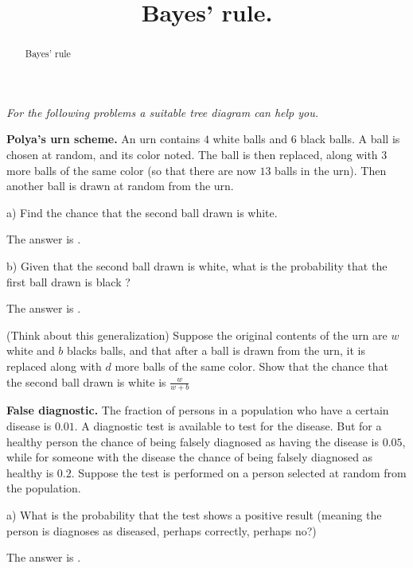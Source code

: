 \documentclass{ximera}
\title{Bayes' rule.}
\begin{document}
\begin{abstract}
Bayes' rule
\end{abstract}
\maketitle

{\it For the following problems a suitable tree diagram can help you.}\vspace{.25cm}

{\bf Polya's urn scheme.} An urn contains $4$ white balls and $6$ black balls. A ball is chosen at random, and its color noted. The ball is then replaced, along with $3$ more balls of the same color (so that there are now $13$ balls in the urn). Then another ball is drawn at random from the urn.

\begin{question}
a) Find the chance that the second ball drawn is white.
     \begin{solution}
          The answer is .
      \end{solution}
\end{question}

\begin{question}
b) Given that the second ball drawn is white, what is the probability that the first ball drawn is black ?
     \begin{solution}
          The answer is .
      \end{solution}
\end{question}
      
\begin{question}
(Think about this generalization) Suppose the original contents of the urn are $w$ white and $b$ blacks balls, and that after a ball is drawn from the urn, it is replaced along with $d$ more balls of the same color. Show that the chance that the second ball drawn is white is $\frac{w}{w+b}$  
\end{question}

{\bf False diagnostic.} The fraction of persons in a population who have a certain disease is $0.01$. A diagnostic test is available to test for the disease. But for a healthy person the chance of being falsely diagnosed as having the disease is $0.05$, while for someone with the disease the chance of being falsely diagnosed as healthy is $0.2$. Suppose the test is performed on a person selected at random from the population.

\begin{question}
a) What is the probability that the test shows a positive result (meaning the person is diagnoses as diseased, perhaps correctly, perhaps no?)
     \begin{solution}
          The answer is  .
      \end{solution}
\end{question}
\end{document}
